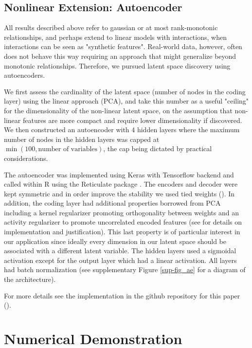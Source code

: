 \documentclass[letterpaper]{article}
\begin{document}
\subsection{Nonlinear Extension: Autoencoder}

All results described above refer to gaussian or at most rank-monotonic relationships, and perhaps extend to linear models with interactions, when interactions can be seen as "synthetic features". Real-world data, however, often does not behave this way requiring an approach that might generalize beyond monotonic relationships.  Therefore, we pursued latent space discovery using autoencoders.

We first assess the cardinality of the latent space (number of nodes in the coding layer) using the linear approach (PCA), and take this number as a useful "ceiling" for the dimensionality of the non-linear latent space, on the assumption that non-linear features are more compact and require lower dimensionality if discovered.  We then constructed an autoencoder with 4 hidden layers where the maximum number of nodes in the hidden layers was capped at $\min (100, \textrm{number of variables})$, the cap being dictated by practical considerations.

The autoencoder was implemented using Keras with Tensorflow backend and called within R using the Reticulate package \cite{reticulate_2020}. The encoders and decoder were kept symmetric and in order improve the stability we used tied weights (\cite{pca_ae}). In addition, the coding layer had additional properties borrowed from PCA including a kernel regularizer promoting orthogonality between weights and an activity regularizer to promote uncorrelated encoded features (see \cite{ranjan_build_2019} for details on implementation and justification). This last property is of particular interest in our application since ideally every dimension in our latent space should be associated with a different latent variable. The hidden layers used a sigmoidal activation except for the output layer which had a linear activation. All layers had batch normalization \cite{ioffe2015batch} (see supplementary Figure \ref{sup-fig_ae} for a diagram of the architecture).

For more details see the implementation in the github repository for this paper (\cite{latent_2020}).

\section{Numerical Demonstration}
\end{document}

